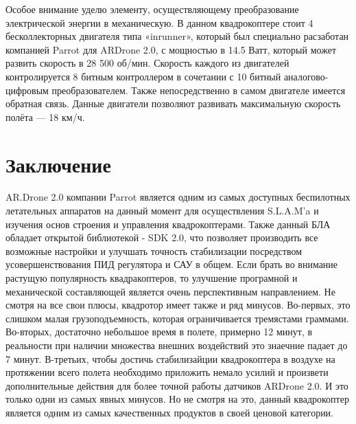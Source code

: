 Особое внимание уделю элементу, осуществляющему преобразование электрической энергии в механическую. В данном квадрокоптере стоит 4 бесколлекторных двигателя типа «inrunner», который был специально расзаботан компанией Parrot для ARDrone 2.0, с мощностью в 14.5 Ватт, который может развить скорость в 28 500 об/мин. Скорость каждого из двигателей контролируется 8 битным контроллером в сочетании с 10 битный аналогово-цифровым преобразователем. Также непосредственно в самом двигателе имеется обратная связь.\cite{Parrot}\cite{hab}
Данные двигатели позволяют развивать максимальную скорость полёта — 18 км/ч.\cite{1}
\newpage 
{}
\section*{Заключение}
AR.Drone 2.0 компании Parrot является одним из самых доступных беспилотных летательных аппаратов на данный момент для осуществления S.L.A.M'a и изучения основ строения и управления квадрокоптерами. Также данный БЛА обладает открытой библиотекой - SDK 2.0, что позволяет производить все возможные настройки и улучшать точность стабилизации посредством усовершенствования ПИД регулятора и САУ в общем. Если брать во внимание растущую популярность квадракоптеров, то улучшение програмной и механической составляющей является очень перспективным направлением. Не смотря на все свои плюсы, квадротор имеет также и ряд минусов. Во-первых, это слишком малая грузоподъемность, которая ограничивается тремястами граммами. Во-вторых, достаточно небольшое время в полете, примерно 12 минут\cite{Parrot}, в реальности при наличии множества внешних воздействий это знаечние падает до 7 минут. 
В-третьих, чтобы достичь стабилизайции квадрокоптера в воздухе на протяжении всего полета необходимо приложить немало усилий и произвети дополнительные действия для более точной работы датчиков ARDrone 2.0. И это только одни из самых явных минусов. Но не смотря на это, данный квадрокоптер является одним из самых качественных продуктов в своей ценовой категории.
\newpage

\renewcommand\refname{Список использованных источников}
 

%


